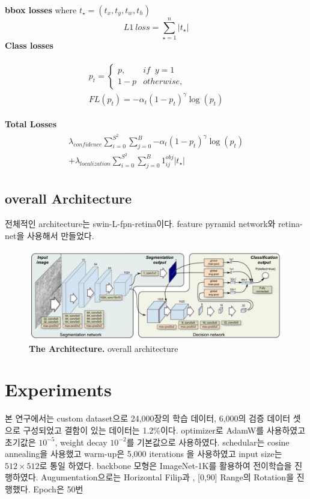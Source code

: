 \documentclass[10pt,twocolumn,letterpaper]{article}
\begin{document}
\textbf{bbox losses} where $t_{\star} = (t_{x},t_{y},t_{w},t_{h})$
\begin{equation}
L1\ loss=\sum_{\star=1}^n\left|t_{\star}\right|
\end{equation} 
\textbf{Class losses}\cite{retinanet}

\begin{align}
  \begin{split}
  p_t = 
  \begin{cases}
  p, & if \; \;  y=1 \\
  1-p
  & otherwise,
  \end{cases} \\ 
  FL(p_t)=-\alpha_t{(1-p_t)}^{\gamma}\log(p_t)
  \end{split}
  \end{align}
  

\textbf{Total Losses}
\begin{align}
  \begin{split}
   \lambda_{confidence}\sum_{i=0}^{S^2}\sum_{j=0}^{B} \mathbb-\alpha_t{(1-p_t)}^{\gamma}\log (p_t) \\ 
    + \lambda_{localization} \sum_{i=0}^{S^2}\sum_{j=0}^{B} 1_{ij}^{obj}|t_{\star}|
  \end{split}
\end{align}
\subsection{overall Architecture}
전체적인 architecture는 swin-L-fpn-retina\cite{fpn}이다.
feature pyramid network와 retina-net을 사용해서 만들었다.
\begin{figure}[ht!]
  \centering
    \includegraphics[width=.8\linewidth]{figure/model}
  \caption{\small \textbf{The Architecture.} overall architecture}
  \label{architecture}
\end{figure}


\section{Experiments}
본 연구에서는 custom dataset으로 24,000장의 학습 데이터, 6,000의 검증 데이터 셋으로 구성되었고 결함이 있는 데이터는 1.2\%이다.
optimizer로 AdamW\cite{AdamW}를 사용하였고 초기값은 ${10}^{-5}$, weight decay ${10}^{-2}$를 기본값으로 사용하였다.
schedular는 cosine annealing을 사용했고 warm-up은 5,000 iterations 을 사용하였고 input size는 $512\times 512$로 통일 하였다.
backbone 모형은 ImageNet-1K를 활용하여 전이학습을 진행하였다.
Augumentation으로는 Horizontal Filip과 , [0,90] Range의 Rotation을 진행했다.
Epoch은 50번
\end{document}
